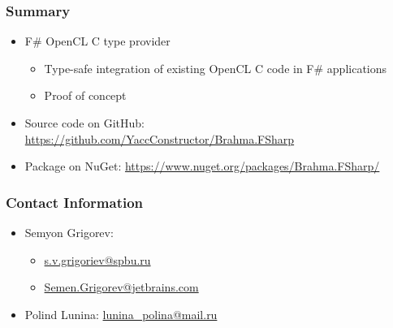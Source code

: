 \documentclass[xcolor=table]{beamer}
\begin{document}
\begin{frame}
  \transwipe[direction=90]
  \frametitle{Summary}
\begin{itemize}
\item F\# OpenCL C type provider
\begin {itemize}
\item Type-safe integration of existing OpenCL C code in F\# applications
\item Proof of concept
\end{itemize}
\vspace{1cm}
\item Source code on GitHub: \url{https://github.com/YaccConstructor/Brahma.FSharp}
\item Package on NuGet: \url{https://www.nuget.org/packages/Brahma.FSharp/}
\end{itemize}
\end{frame}

\begin{frame}
\frametitle{Contact Information}
\begin{itemize}
  \item Semyon Grigorev:
    \begin{itemize}
      \item \href{mailto:s.v.grigoriev@spbu.ru}{s.v.grigoriev@spbu.ru}
      \item \href{mailto:Semen.Grigorev@jetbrains.com}{Semen.Grigorev@jetbrains.com}
    \end{itemize}
  \item Polind Lunina: \href{mailto:lunina_polina@mail.ru}{lunina\_polina@mail.ru}
\end{itemize}
\hspace{2cm}
\end{frame}
\end{document}
